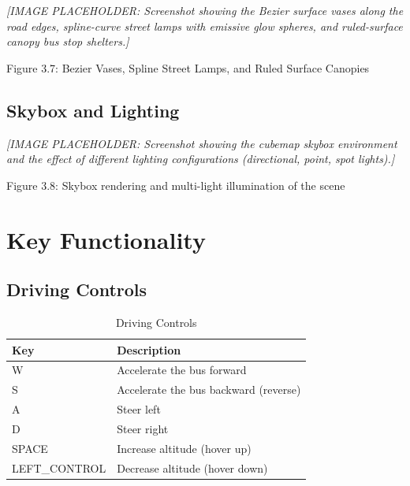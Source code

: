 \documentclass[12pt,a4paper]{article}
\begin{document}
\textit{[IMAGE PLACEHOLDER: Screenshot showing the Bezier surface vases along the road edges, spline-curve street lamps with emissive glow spheres, and ruled-surface canopy bus stop shelters.]}

\begin{center}
    Figure 3.7: Bezier Vases, Spline Street Lamps, and Ruled Surface Canopies
\end{center}

\subsection{Skybox and Lighting}

\textit{[IMAGE PLACEHOLDER: Screenshot showing the cubemap skybox environment and the effect of different lighting configurations (directional, point, spot lights).]}

\begin{center}
    Figure 3.8: Skybox rendering and multi-light illumination of the scene
\end{center}

\section{Key Functionality}

\subsection{Driving Controls}

\begin{table}[H]
\centering
\begin{tabular}{ll}
\toprule
\textbf{Key} & \textbf{Description} \\
\midrule
W & Accelerate the bus forward \\
S & Accelerate the bus backward (reverse) \\
A & Steer left \\
D & Steer right \\
SPACE & Increase altitude (hover up) \\
LEFT\_CONTROL & Decrease altitude (hover down) \\
\bottomrule
\end{tabular}
\caption{Driving Controls}
\end{table}
\end{document}
